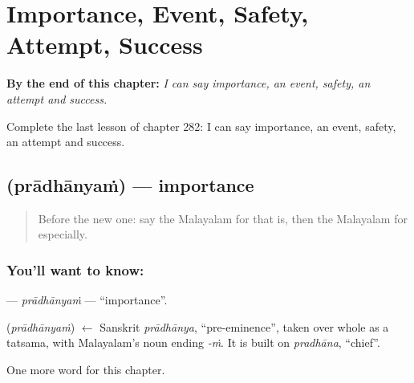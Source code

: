 
\chapter{Importance, Event, Safety, Attempt, Success}
\label{ch:ml-importance-event-safety-attempt-success}

\begin{chapteropening}
\textbf{By the end of this chapter:} \emph{I can say importance, an event, safety, an attempt and success.}

Complete the last lesson of chapter 282: I can say importance, an event, safety, an attempt and success.
\end{chapteropening}

\section[\texorpdfstring{\ml{പ്രാധാന്യം} (prādhānyaṁ)}{പ്രാധാന്യം (prādhānyaṁ)}]{ (prādhānyaṁ) — importance}

\label{lesson:ML-C282-pradhanyam}



\begin{quote}
Before the new one: say the Malayalam for that is, then the Malayalam for especially.
\end{quote}

\subsection*{You'll want to know: }
\textbf{} — \emph{prādhānyaṁ} — \textquotedblleft{}importance\textquotedblright{}.

\begin{cousinweb}
\textbf{} (\emph{prādhānyaṁ}) $\leftarrow$ Sanskrit \emph{prādhānya}, \textquotedblleft{}pre-eminence\textquotedblright{}, taken over whole as a tatsama, with Malayalam's noun ending \emph{-ṁ}. It is built on \emph{pradhāna}, \textquotedblleft{}chief\textquotedblright{}.
\end{cousinweb}

\begin{grammarlens}[title={What you've built}]
One more word for this chapter.
\end{grammarlens}

